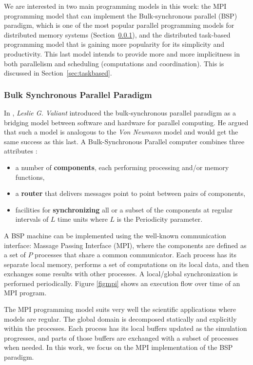 We are interested in two main programming models in this work: the MPI programming model that can implement the Bulk-synchronous parallel (BSP) paradigm, which is one of the most popular parallel programming models for distributed memory systems \cite{BRINSKIY2015305_MPI_3} (Section~\ref{BSP}), and the distributed task-based programming model that is gaining more popularity for its simplicity and productivity. This last model intends to provide more and more implicitness in both parallelism and scheduling (computations and coordination). This is discussed in Section~\ref{sec:taskbased}.


\subsubsection{Bulk Synchronous Parallel Paradigm}\label{BSP}
In \cite{valiant1990bsp}, \textit{Leslie G. Valiant} introduced the bulk-synchronous parallel paradigm as a bridging model between software and hardware for parallel computing. He argued that such a model is analogous to the \textit{Von Neumann} model and would get the same success as this last.
A Bulk-Synchronous Parallel computer combines three attributes : 
\begin{itemize}
    \item a number of \textbf{components}, each performing processing and/or memory functions,
    \item a \textbf{router} that delivers messages point to point between pairs of components,
    \item facilities for \textbf{synchronizing} all or a subset of the components at regular intervals of $L$ time units where $L$ is the Periodicity parameter.
\end{itemize}

A BSP machine can be implemented using the well-known communication interface: Massage Passing Interface (MPI), where the components are defined as a set of $P$ processes that share a common communicator. Each process has its separate local memory, performs a set of computations on its local data, and then exchanges some results with other processes. A local/global synchronization is performed periodically. Figure \ref{figmpi} shows an execution flow over time of an MPI program. 

The MPI programming model suits very well the scientific applications where models are regular. The global domain is decomposed statically and explicitly within the processes. Each process has its local buffers updated as the simulation progresses, and parts of those buffers are exchanged with a subset of processes when needed. In this work, we focus on the MPI implementation of the BSP paradigm.

